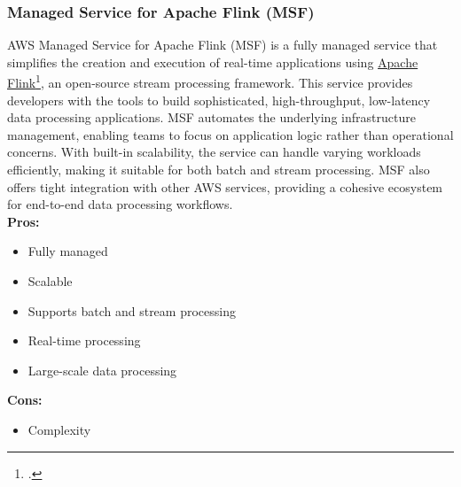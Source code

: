         \subsubsection{Managed Service for Apache Flink (MSF)}
        \label{aws:msf}
        AWS Managed Service for Apache Flink (MSF) is a fully managed service that simplifies the creation and execution of real-time applications using \href{https://flink.apache.org/}{Apache Flink}\footcite{site:apache-flink}, an open-source stream processing framework. This service provides developers with the tools to build sophisticated, high-throughput, low-latency data processing applications. MSF automates the underlying infrastructure management, enabling teams to focus on application logic rather than operational concerns. With built-in scalability, the service can handle varying workloads efficiently, making it suitable for both batch and stream processing. MSF also offers tight integration with other AWS services, providing a cohesive ecosystem for end-to-end data processing workflows.\\

        \textbf{Pros:}
        \begin{itemize}
            \item Fully managed
            \item Scalable
            \item Supports batch and stream processing
            \item Real-time processing
            \item Large-scale data processing
        \end{itemize}
        \textbf{Cons:}
        \begin{itemize}
            \item Complexity
        \end{itemize}

